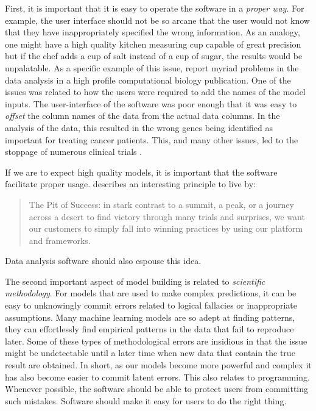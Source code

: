 \documentclass[11pt]{book}
\begin{document}
First, it is important that it is easy to operate the software in a \emph{proper way}. For example, the user interface should not be so arcane that the user would not know that they have inappropriately specified the wrong information. As an analogy, one might have a high quality kitchen measuring cup capable of great precision but if the chef adds a cup of salt instead of a cup of sugar, the results would be unpalatable. As a specific example of this issue, \citet{baggerly2009} report myriad problems in the data analysis in a high profile computational biology publication. One of the issues was related to how the users were required to add the names of the model inputs. The user-interface of the software was poor enough that it was easy to \emph{offset} the column names of the data from the actual data columns. In the analysis of the data, this resulted in the wrong genes being identified as important for treating cancer patients. This, and many other issues, led to the stoppage of numerous clinical trials \citep{Carlson2012}.

If we are to expect high quality models, it is important that the software facilitate proper usage. \citet{abrams2003} describes an interesting principle to live by:

\begin{quote}
The Pit of Success: in stark contrast to a summit, a peak, or a journey across a desert to find victory through many trials and surprises, we want our customers to simply fall into winning practices by using our platform and frameworks.
\end{quote}

Data analysis software should also espouse this idea.

The second important aspect of model building is related to \emph{scientific methodology}. For models that are used to make complex predictions, it can be easy to unknowingly commit errors related to logical fallacies or inappropriate assumptions. Many machine learning models are so adept at finding patterns, they can effortlessly find empirical patterns in the data that fail to reproduce later. Some of these types of methodological errors are insidious in that the issue might be undetectable until a later time when new data that contain the true result are obtained. In short, as our models become more powerful and complex it has also become easier to commit latent errors. This also relates to programming. Whenever possible, the software should be able to protect users from committing such mistakes. Software should make it easy for users to do the right thing.
\end{document}
